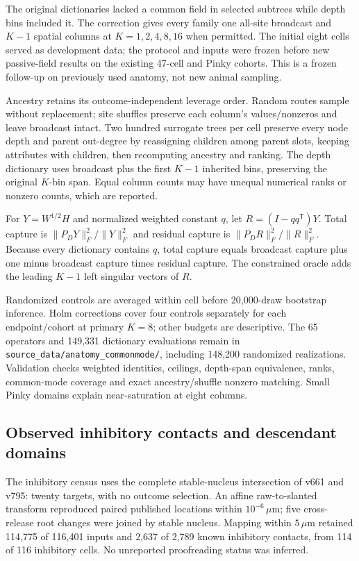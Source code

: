 The original dictionaries lacked a common field in selected subtrees while depth bins included it. The correction gives every family one all-site broadcast and $K-1$ spatial columns at $K=1,2,4,8,16$ when permitted. The initial eight cells served as development data; the protocol and inputs were frozen before new passive-field results on the existing 47-cell and Pinky cohorts. This is a frozen follow-up on previously used anatomy, not new animal sampling.

Ancestry retains its outcome-independent leverage order. Random routes sample without replacement; site shuffles preserve each column's values/nonzeros and leave broadcast intact. Two hundred surrogate trees per cell preserve every node depth and parent out-degree by reassigning children among parent slots, keeping attributes with children, then recomputing ancestry and ranking. The depth dictionary uses broadcast plus the first $K-1$ inherited bins, preserving the original $K$-bin span. Equal column counts may have unequal numerical ranks or nonzero counts, which are reported.

For $Y=W^{1/2}H$ and normalized weighted constant $q$, let $R=(I-qq^{\mathsf T})Y$. Total capture is $\|P_DY\|_F^2/\|Y\|_F^2$ and residual capture is $\|P_DR\|_F^2/\|R\|_F^2$. Because every dictionary contains $q$, total capture equals broadcast capture plus one minus broadcast capture times residual capture. The constrained oracle adds the leading $K-1$ left singular vectors of $R$.

Randomized controls are averaged within cell before 20,000-draw bootstrap inference. Holm corrections cover four controls separately for each endpoint/cohort at primary $K=8$; other budgets are descriptive. The 65 operators and 149,331 dictionary evaluations remain in \texttt{source\_data/anatomy\_commonmode/}, including 148,200 randomized realizations. Validation checks weighted identities, ceilings, depth-span equivalence, ranks, common-mode coverage and exact ancestry/shuffle nonzero matching. Small Pinky domains explain near-saturation at eight columns.

\subsection{Observed inhibitory contacts and descendant domains}
\label{note:inhibitory_census}
The inhibitory census uses the complete stable-nucleus intersection of v661 and v795: twenty targets, with no outcome selection. An affine raw-to-slanted transform reproduced paired published locations within $10^{-6}\,\mu$m; five cross-release root changes were joined by stable nucleus. Mapping within $5\,\mu$m retained 114,775 of 116,401 inputs and 2,637 of 2,789 known inhibitory contacts, from 114 of 116 inhibitory cells. No unreported proofreading status was inferred.

